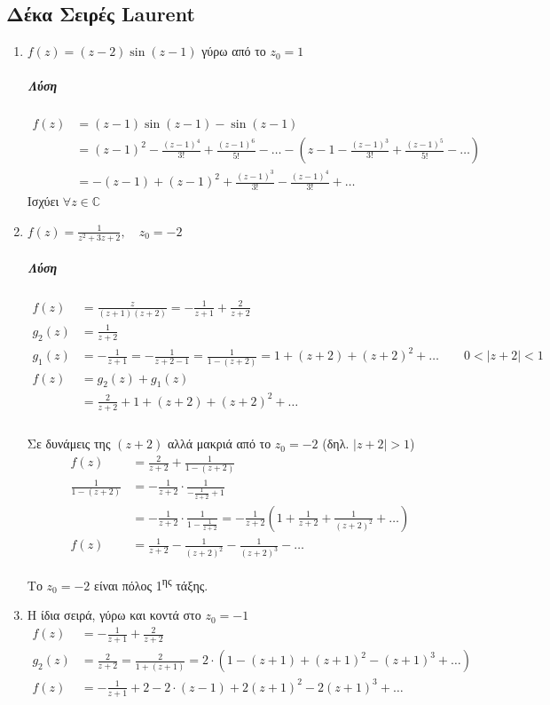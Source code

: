 \documentclass[12pt,a4paper,titlepage,fleqn]{article}
\begin{document}
  \subsection{Δέκα Σειρές Laurent}
  \begin{enumerate}
  	\item \( f(z) = (z-2)\sin(z-1) \) γύρω από το \( z_0 = 1 \)
  	\subparagraph{Λύση}
  	\begin{align*}
  		f(z) &= (z-1)\sin(z-1) - \sin(z-1)
  		\\ &= (z-1)^2 - \frac{(z-1)^4}{3!} + \frac{(z-1)^6}{5!} - \dots 
  		-\left( z-1-\frac{(z-1)^3}{3!} + \frac{(z-1)^5}{5!} - \dots \right)
  		\\ &= -(z-1)+(z-1)^2+\frac{(z-1)^3}{3!} - \frac{(z-1)^4}{3!} + \dots
  	\end{align*}
  	Ισχύει \( \forall z \in \mathbb C  \)
  	
  	\item \( f(z) = \frac{1}{z^2+3z+2},\quad z_0=-2 \)
  	\subparagraph{Λύση}
  	\begin{align*}
  		f(z) &= \frac{z}{(z+1)(z+2)} = -\frac{1}{z+1} + \frac{2}{z+2} \\
  		g_2(z) &= \frac{1}{z+2} \\
  		g_1(z) &= -\frac{1}{z+1} = - \frac{1}{z+2-1}
  		= \frac{1}{1-(z+2)} = 1 + (z+2) + (z+2)^2+\dots \qquad
  		0<|z+2|<1 \\
  		f(z) &= g_2(z)+g_1(z) \\ &= 
  		\frac{2}{z+2} + 1 + (z+2) + (z+2)^2+\dots 
	\end{align*}
	
	\subparagraph{}
	Σε δυνάμεις της \( (z+2) \) αλλά μακριά από το \( z_0=-2 \)
	(δηλ. \( |z+2|>1 \))
	\begin{align*}
		f(z) &= \frac{2}{z+2} + \frac{1}{1-(z+2)} \\
		\frac{1}{1-(z+2)} &= -\frac{1}{z+2}\cdot\frac{1}{-\frac{1}{z+2}+1}
		\\ &= - \frac{1}{z+2} \cdot \frac{1}{1-\frac{1}{z+2}}
		= - \frac{1}{z+2} \left(1+\frac{1}{z+2}+\frac{1}{(z+2)^2}+\dots\right) \\
		f(z) &= \frac{1}{z+2} - \frac{1}{(z+2)^2} - \frac{1}{(z+2)^3} - \dots
	\end{align*}
	
	Το \( z_0 = -2 \) είναι πόλος 1\textsuperscript{ης} τάξης.
	
	\item Η ίδια σειρά, γύρω και κοντά στο \( z_0 = -1 \)
	\begin{align*}
	f(z) &= -\frac{1}{z+1} + \frac{2}{z+2} \\
	g_2(z) &= \frac{2}{z+2} = \frac{2}{1+(z+1)} = 
	2\cdot\left( 1-(z+1)+(z+1)^2-(z+1)^3+\dots \right) \\
	f(z) &= -\frac{1}{z+1} +2 -2\cdot(z-1)+2(z+1)^2-2(z+1)^3+\dots
	\end{align*}
	

\end{enumerate}
\end{document}
